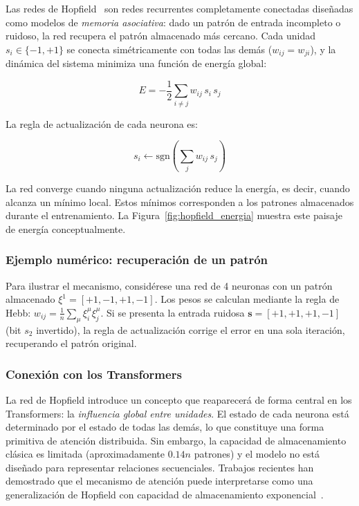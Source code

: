 Las redes de Hopfield~\cite{hopfield1982neural} son redes recurrentes
completamente conectadas diseñadas como modelos de \textit{memoria asociativa}:
dado un patrón de entrada incompleto o ruidoso, la red recupera el patrón
almacenado más cercano. Cada unidad $s_i \in \{-1, +1\}$ se conecta
simétricamente con todas las demás ($w_{ij} = w_{ji}$), y la dinámica del
sistema minimiza una función de energía global:

\begin{equation}
    E = -\frac{1}{2} \sum_{i \neq j} w_{ij} \, s_i \, s_j
\end{equation}

La regla de actualización de cada neurona es:

\begin{equation}
    s_i \leftarrow \text{sgn}\!\left(\sum_{j} w_{ij} \, s_j\right)
\end{equation}

La red converge cuando ninguna actualización reduce la energía, es decir,
cuando alcanza un mínimo local. Estos mínimos corresponden a los patrones
almacenados durante el entrenamiento. La Figura~\ref{fig:hopfield_energia}
muestra este paisaje de energía conceptualmente.



\subsubsection*{Ejemplo numérico: recuperación de un patrón}

Para ilustrar el mecanismo, considérese una red de 4 neuronas con un patrón
almacenado $\xi^1 = [+1,-1,+1,-1]$. Los pesos se calculan mediante la regla
de Hebb:
$w_{ij} = \frac{1}{n} \sum_\mu \xi_i^\mu \xi_j^\mu$.
Si se presenta la entrada ruidosa $\bm{s} = [+1,+1,+1,-1]$ (bit $s_2$
invertido), la regla de actualización corrige el error en una sola iteración,
recuperando el patrón original.



\subsubsection*{Conexión con los Transformers}

La red de Hopfield introduce un concepto que reaparecerá de forma central en
los Transformers: la \textit{influencia global entre unidades}. El estado de
cada neurona está determinado por el estado de todas las demás, lo que
constituye una forma primitiva de atención distribuida. Sin embargo, la
capacidad de almacenamiento clásica es limitada (aproximadamente $0.14n$
patrones) y el modelo no está diseñado para representar relaciones
secuenciales. Trabajos recientes han demostrado que el mecanismo de atención
puede interpretarse como una generalización de Hopfield con capacidad de
almacenamiento exponencial~\cite{ramsauer2020hopfield}.

